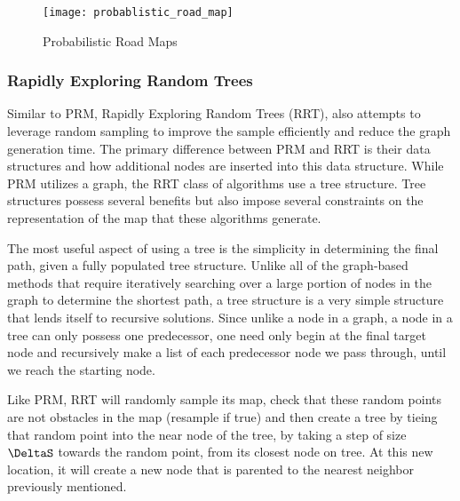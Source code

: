 

\begin{figure}[h!]
    \texttt{[image: probablistic\_road\_map]}
    \centering
    \label{fig:PRM}
    \caption{Probabilistic Road Maps}
  \end{figure}

\subsubsection{Rapidly Exploring Random Trees}

Similar to PRM, Rapidly Exploring Random Trees (RRT), also attempts to leverage random sampling to improve the sample efficiently and reduce the graph generation time. The primary difference between PRM and RRT is their data structures and how additional nodes are inserted into this data structure. While PRM utilizes a graph, the RRT class of algorithms use a tree structure. Tree structures possess several benefits but also impose several constraints on the representation of the map that these algorithms generate. 

The most useful aspect of using a tree is the simplicity in determining the final path, given a fully populated tree structure. Unlike all of the graph-based methods that require iteratively searching over a large portion of nodes in the graph to determine the shortest path, a tree structure is a very simple structure that lends itself to recursive solutions. Since unlike a node in a graph, a node in a tree can only possess one predecessor, one need only begin at the final target node and recursively make a list of each predecessor node we pass through, until we reach the starting node. 

Like PRM, RRT will randomly sample its map, check that these random points are not obstacles in the map (resample if true) and then create a tree by tieing that random point into the near node of the tree, by taking a step of size $\DeltaS$ towards the random point, from its closest node on tree. At this new location, it will create a new node that is parented to the nearest neighbor previously mentioned. 



